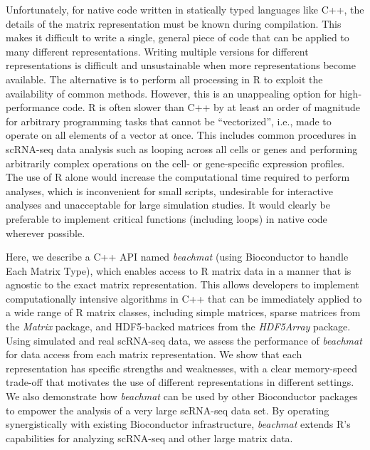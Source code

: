 \documentclass[10pt,letterpaper]{article}
\newcommand{\beachmat}{\textit{beachmat}}
\begin{document}
Unfortunately, for native code written in statically typed languages like C++, the details of the matrix representation must be known during compilation.
This makes it difficult to write a single, general piece of code that can be applied to many different representations.
Writing multiple versions for different representations is difficult and unsustainable when more representations become available.
The alternative is to perform all processing in R to exploit the availability of common methods.
However, this is an unappealing option for high-performance code.
R is often slower than C++ by at least an order of magnitude for arbitrary programming tasks that cannot be ``vectorized'', i.e., made to operate on all elements of a vector at once.
This includes common procedures in scRNA-seq data analysis such as looping across all cells or genes and performing arbitrarily complex operations on the cell- or gene-specific expression profiles.
The use of R alone would increase the computational time required to perform analyses, which is inconvenient for small scripts, undesirable for interactive analyses and unacceptable for large simulation studies.
It would clearly be preferable to implement critical functions (including loops) in native code wherever possible.


Here, we describe a C++ API named \beachmat{} (using Bioconductor to handle Each Matrix Type), which enables access to R matrix data in a manner that is agnostic to the exact matrix representation.
This allows developers to implement computationally intensive algorithms in C++ that can be immediately applied to a wide range of R matrix classes, including simple matrices, sparse matrices from the \textit{Matrix} package, and HDF5-backed matrices from the \textit{HDF5Array} package.
Using simulated and real scRNA-seq data, we assess the performance of \beachmat{} for data access from each matrix representation.
We show that each representation has specific strengths and weaknesses, with a clear memory-speed trade-off that motivates the use of different representations in different settings.
We also demonstrate how \beachmat{} can be used by other Bioconductor packages to empower the analysis of a very large scRNA-seq data set. 
By operating synergistically with existing Bioconductor infrastructure, \beachmat{} extends R's capabilities for analyzing scRNA-seq and other large matrix data.
\end{document}
